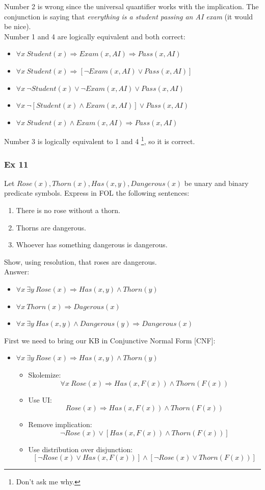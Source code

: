 \documentclass[10pt,a4paper]{article}
\begin{document}
\begin{enumerate}
\begin{enumerate}
\end{enumerate}

Number 2 is wrong since the universal quantifier works with the implication. The conjunction is saying that \textit{everything is a student passing an AI exam} (it would be nice).\\
Number 1 and 4 are logically equivalent and both correct:
\begin{itemize}
\item $\forall x\ Student(x)\Rightarrow Exam(x, AI)\Rightarrow Pass(x,AI)$
\item $\forall x\ Student(x)\Rightarrow [\neg Exam(x, AI)\vee Pass(x,AI)]$
\item $\forall x\ \neg Student(x)\vee \neg Exam(x, AI)\vee Pass(x,AI)$
\item $\forall x\ \neg [Student(x)\wedge  Exam(x, AI)]\vee Pass(x,AI)$
\item $\forall x\ Student(x)\wedge  Exam(x, AI)\Rightarrow Pass(x,AI)$
\end{itemize} 
Number 3 is logically equivalent to 1 and 4 \footnote{Don't ask me why.}, so it is correct.


\subsubsection{Ex 11}
Let $Rose(x),Thorn(x), Has(x, y), Dangerous(x)$ be unary and binary predicate symbols. Express in FOL the following sentences:
\begin{enumerate}
\item There is no rose without a thorn.
\item Thorns are dangerous.
\item Whoever has something dangerous is dangerous.
\end{enumerate}
Show, using resolution, that roses are dangerous.\\

Answer:
\begin{itemize}
\item $\forall x\ \exists y \ Rose(x) \Rightarrow Has(x,y)\wedge Thorn(y)$
\item $\forall x\ Thorn(x) \Rightarrow Dagerous(x)$
\item $\forall x\ \exists y\ Has(x,y)\wedge Dangerous(y) \Rightarrow Dangerous(x)$
\end{itemize}

First we need to bring our KB in Conjunctive Normal Form [CNF]:
\begin{itemize}
\item $\forall x\ \exists y \ Rose(x) \Rightarrow Has(x,y)\wedge Thorn(y)$
\begin{itemize}
\item Skolemize:
\[\forall x\ Rose(x) \Rightarrow Has(x,F(x))\wedge Thorn(F(x))\]
\item Use UI:
\[Rose(x) \Rightarrow Has(x,F(x))\wedge Thorn(F(x))\]
\item Remove implication:
\[\neg Rose(x) \vee [Has(x,F(x))\wedge Thorn(F(x))]\]
\item Use distribution over disjunction:
\[[\neg Rose(x) \vee Has(x,F(x))] \wedge [\neg Rose(x) \vee Thorn(F(x))]\]


\end{itemize}
\end{itemize}
\end{enumerate}
\end{document}
